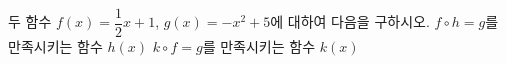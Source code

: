 \hspace*{2mm}\begin{minipage}[t]{\dimexpr\linewidth-2mm\relax}\vspace{0pt}
두 함수 $f(x)=\dfrac{1}{2}x+1$, $g(x)=-x^2+5$에 대하여 다음을 구하시오.
 $f\circ h=g$를 만족시키는 함수 $h(x)$
 $k\circ f=g$를 만족시키는 함수 $k(x)$\end{minipage}
